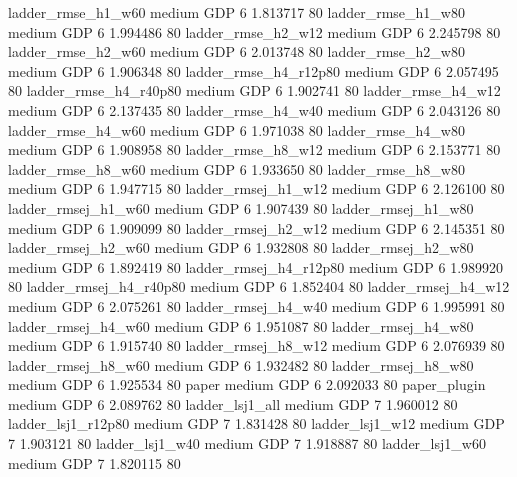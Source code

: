     ladder_rmse_h1_w60     medium      GDP                 6 1.813717 80
    ladder_rmse_h1_w80     medium      GDP                 6 1.994486 80
    ladder_rmse_h2_w12     medium      GDP                 6 2.245798 80
    ladder_rmse_h2_w60     medium      GDP                 6 2.013748 80
    ladder_rmse_h2_w80     medium      GDP                 6 1.906348 80
 ladder_rmse_h4_r12p80     medium      GDP                 6 2.057495 80
 ladder_rmse_h4_r40p80     medium      GDP                 6 1.902741 80
    ladder_rmse_h4_w12     medium      GDP                 6 2.137435 80
    ladder_rmse_h4_w40     medium      GDP                 6 2.043126 80
    ladder_rmse_h4_w60     medium      GDP                 6 1.971038 80
    ladder_rmse_h4_w80     medium      GDP                 6 1.908958 80
    ladder_rmse_h8_w12     medium      GDP                 6 2.153771 80
    ladder_rmse_h8_w60     medium      GDP                 6 1.933650 80
    ladder_rmse_h8_w80     medium      GDP                 6 1.947715 80
   ladder_rmsej_h1_w12     medium      GDP                 6 2.126100 80
   ladder_rmsej_h1_w60     medium      GDP                 6 1.907439 80
   ladder_rmsej_h1_w80     medium      GDP                 6 1.909099 80
   ladder_rmsej_h2_w12     medium      GDP                 6 2.145351 80
   ladder_rmsej_h2_w60     medium      GDP                 6 1.932808 80
   ladder_rmsej_h2_w80     medium      GDP                 6 1.892419 80
ladder_rmsej_h4_r12p80     medium      GDP                 6 1.989920 80
ladder_rmsej_h4_r40p80     medium      GDP                 6 1.852404 80
   ladder_rmsej_h4_w12     medium      GDP                 6 2.075261 80
   ladder_rmsej_h4_w40     medium      GDP                 6 1.995991 80
   ladder_rmsej_h4_w60     medium      GDP                 6 1.951087 80
   ladder_rmsej_h4_w80     medium      GDP                 6 1.915740 80
   ladder_rmsej_h8_w12     medium      GDP                 6 2.076939 80
   ladder_rmsej_h8_w60     medium      GDP                 6 1.932482 80
   ladder_rmsej_h8_w80     medium      GDP                 6 1.925534 80
                 paper     medium      GDP                 6 2.092033 80
          paper_plugin     medium      GDP                 6 2.089762 80
       ladder_lsj1_all     medium      GDP                 7 1.960012 80
    ladder_lsj1_r12p80     medium      GDP                 7 1.831428 80
       ladder_lsj1_w12     medium      GDP                 7 1.903121 80
       ladder_lsj1_w40     medium      GDP                 7 1.918887 80
       ladder_lsj1_w60     medium      GDP                 7 1.820115 80

